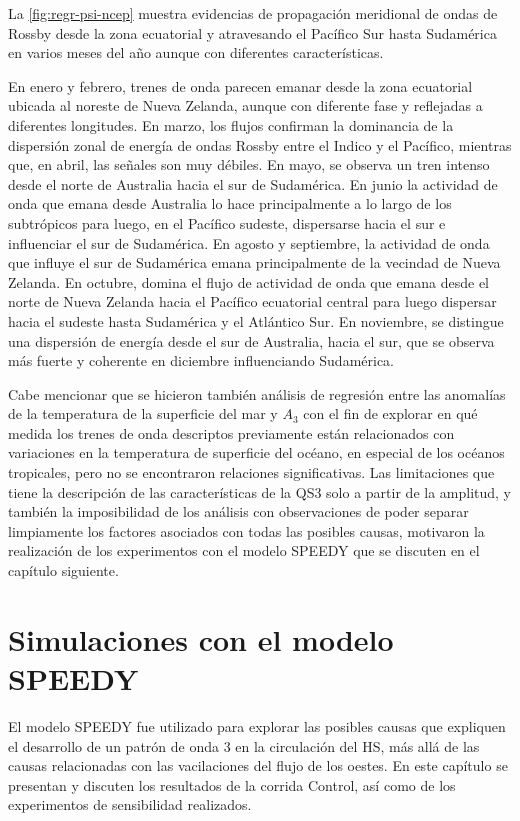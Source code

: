 \documentclass[spanish,a4paper,12pt,oneside]{book}
\begin{document}
La \autoref{fig:regr-psi-ncep} muestra evidencias de propagación
meridional de ondas de Rossby desde la zona ecuatorial y atravesando el
Pacífico Sur hasta Sudamérica en varios meses del año aunque con
diferentes características.

En enero y febrero, trenes de onda parecen emanar desde la zona
ecuatorial ubicada al noreste de Nueva Zelanda, aunque con diferente
fase y reflejadas a diferentes longitudes. En marzo, los flujos
confirman la dominancia de la dispersión zonal de energía de ondas
Rossby entre el Indico y el Pacífico, mientras que, en abril, las
señales son muy débiles. En mayo, se observa un tren intenso desde el
norte de Australia hacia el sur de Sudamérica. En junio la actividad de
onda que emana desde Australia lo hace principalmente a lo largo de los
subtrópicos para luego, en el Pacífico sudeste, dispersarse hacia el sur
e influenciar el sur de Sudamérica. En agosto y septiembre, la actividad
de onda que influye el sur de Sudamérica emana principalmente de la
vecindad de Nueva Zelanda. En octubre, domina el flujo de actividad de
onda que emana desde el norte de Nueva Zelanda hacia el Pacífico
ecuatorial central para luego dispersar hacia el sudeste hasta
Sudamérica y el Atlántico Sur. En noviembre, se distingue una dispersión
de energía desde el sur de Australia, hacia el sur, que se observa más
fuerte y coherente en diciembre influenciando Sudamérica.

Cabe mencionar que se hicieron también análisis de regresión entre las
anomalías de la temperatura de la superficie del mar y \(A_3\) con el
fin de explorar en qué medida los trenes de onda descriptos previamente
están relacionados con variaciones en la temperatura de superficie del
océano, en especial de los océanos tropicales, pero no se encontraron
relaciones significativas. Las limitaciones que tiene la descripción de
las características de la QS3 solo a partir de la amplitud, y también la
imposibilidad de los análisis con observaciones de poder separar
limpiamente los factores asociados con todas las posibles causas,
motivaron la realización de los experimentos con el modelo SPEEDY que se
discuten en el capítulo siguiente.

\hypertarget{simulaciones-con-el-modelo-speedy}{%
\chapter{Simulaciones con el modelo
SPEEDY}\label{simulaciones-con-el-modelo-speedy}}

El modelo SPEEDY fue utilizado para explorar las posibles causas que
expliquen el desarrollo de un patrón de onda 3 en la circulación del HS,
más allá de las causas relacionadas con las vacilaciones del flujo de
los oestes. En este capítulo se presentan y discuten los resultados de
la corrida Control, así como de los experimentos de sensibilidad
realizados.
\end{document}
